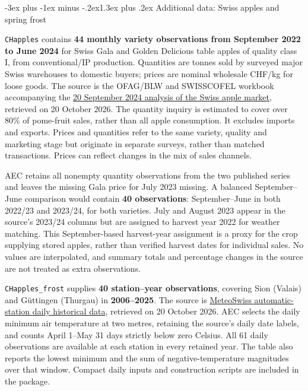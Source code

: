 \documentclass[
  11pt,
]{book}
\makeatletter
\renewcommand\section{\@startsection{section}{1}{\z@}
  {-3ex plus -1ex minus -.2ex}{1.3ex plus .2ex}
  {\normalfont\Large\bfseries\color{TextbookInk}}}
\theoremstyle{definition}
\theoremstyle{definition}
\theoremstyle{definition}
\theoremstyle{definition}
\theoremstyle{remark}
\makeatother
\begin{document}
\section{Additional data: Swiss apples and spring frost}\label{data-apples}

\texttt{CHapples} contains \textbf{44 monthly variety observations from September 2022 to June 2024} for Swiss Gala and Golden Delicious table apples of quality class I, from conventional/IP production. Quantities are tonnes sold by surveyed major Swiss warehouses to domestic buyers; prices are nominal wholesale CHF/kg for loose goods. The source is the OFAG/BLW and SWISSCOFEL workbook accompanying the \href{https://www.donnees-agrimarche.ch/blog/nouvel-apercu-marche-suisse-pommes}{20 September 2024 analysis of the Swiss apple market}, retrieved on 20 October 2026. The quantity inquiry is estimated to cover over 80\% of pome-fruit sales, rather than all apple consumption. It excludes imports and exports. Prices and quantities refer to the same variety, quality and marketing stage but originate in separate surveys, rather than matched transactions. Prices can reflect changes in the mix of sales channels.

AEC retains all nonempty quantity observations from the two published series and leaves the missing Gala price for July 2023 missing. A balanced September--June comparison would contain \textbf{40 observations}: September--June in both 2022/23 and 2023/24, for both varieties. July and August 2023 appear in the source's 2023/24 columns but are assigned to harvest year 2022 for weather matching. This September-based harvest-year assignment is a proxy for the crop supplying stored apples, rather than verified harvest dates for individual sales. No values are interpolated, and summary totals and percentage changes in the source are not treated as extra observations.

\texttt{CHapples\_frost} supplies \textbf{40 station--year observations}, covering Sion (Valais) and Güttingen (Thurgau) in \textbf{2006--2025}. The source is \href{https://opendatadocs.meteoswiss.ch/a-data-groundbased/a1-automatic-weather-stations}{MeteoSwiss automatic-station daily historical data}, retrieved on 20 October 2026. AEC selects the daily minimum air temperature at two metres, retaining the source's daily date labels, and counts April 1--May 31 days strictly below zero Celsius. All 61 daily observations are available at each station in every retained year. The table also reports the lowest minimum and the sum of negative-temperature magnitudes over that window. Compact daily inputs and construction scripts are included in the package.
\end{document}
